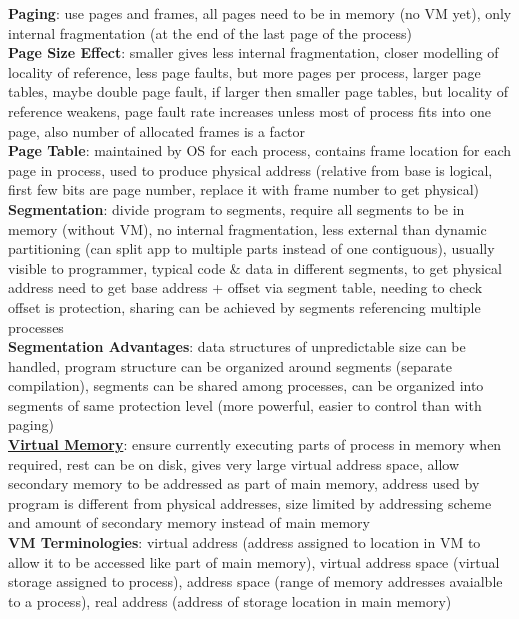 \documentclass[a4paper]{article}
\begin{document}
\begin{multicols}{2}
        \textbf{Paging}: use pages and frames, all pages need to be in memory (no VM yet), only internal fragmentation (at the end of the last page of the process)\\
        \textbf{Page Size Effect}: smaller gives less internal fragmentation, closer modelling of locality of reference, less page faults, but more pages per process, larger page tables, maybe double page fault, if larger then smaller page tables, but locality of reference weakens, page fault rate increases unless most of process fits into one page, also number of allocated frames is a factor\\
        \textbf{Page Table}: maintained by OS for each process, contains frame location for each page in process, used to produce physical address (relative from base is logical, first few bits are page number, replace it with frame number to get physical)\\
        \textbf{Segmentation}: divide program to segments, require all segments to be in memory (without VM), no internal fragmentation, less external than dynamic partitioning (can split app to multiple parts instead of one contiguous), usually visible to programmer, typical code \& data in different segments, to get physical address need to get base address + offset via segment table, needing to check offset is protection, sharing can be achieved by segments referencing multiple processes\\
        \textbf{Segmentation Advantages}: data structures of unpredictable size can be handled, program structure can be organized around segments (separate compilation), segments can be shared among processes, can be organized into segments of same protection level (more powerful, easier to control than with paging)\\
        \underline{\textbf{Virtual Memory}}: ensure currently executing parts of process in memory when required, rest can be on disk, gives very large virtual address space, allow secondary memory to be addressed as part of main memory, address used by program is different from physical addresses, size limited by addressing scheme and amount of secondary memory instead of main memory\\
        \textbf{VM Terminologies}: virtual address (address assigned to location in VM to allow it to be accessed like part of main memory), virtual address space (virtual storage assigned to process), address space (range of memory addresses avaialble to a process), real address (address of storage location in main memory)\\

\end{multicols}
\end{document}
